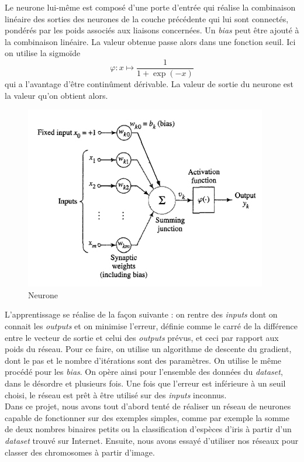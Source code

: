 \documentclass[a4paper,10pt]{article}
\begin{document}
Le neurone lui-même est composé d'une porte d'entrée qui réalise la combinaison linéaire des sorties des neurones de la couche
précédente qui lui sont connectés, pondérés par les poids associés aux liaisons concernées. Un \textit{bias} peut être ajouté
à la combinaison linéaire. La valeur obtenue
passe alors dans une fonction seuil. Ici on utilise la sigmoïde $$ \varphi : x \longmapsto \frac{1}{1+\exp(-x)}$$ qui a l'avantage
d'être continûment dérivable. La valeur de sortie du neurone est la valeur qu'on obtient alors.

\begin{figure}[H]
\centering
\includegraphics[scale = 0.6]{neuron}
\caption{Neurone}
 
\end{figure}

L'apprentissage se réalise de la façon suivante : on rentre des \textit{inputs} dont on connait les \textit{outputs} et on minimise
l'erreur, définie comme le carré de la différence entre le vecteur de sortie et celui des \textit{outputs} prévus, et ceci par rapport
aux poids du réseau. Pour ce faire, on utilise un algorithme de descente du gradient, dont le pas et le nombre d'itérations 
sont des paramètres. On utilise le même procédé pour les \textit{bias}. On opère ainsi pour l'ensemble des données du \textit{dataset}, 
dans le désordre et plusieurs fois. Une fois que l'erreur est inférieure à un seuil choisi, le réseau est prêt à être utilisé 
sur des \textit{inputs} inconnus.
\\
Dans ce projet, nous avons tout d'abord tenté de réaliser un réseau de neurones capable de fonctionner sur des exemples simples, comme 
par exemple la somme de deux nombres binaires petits ou la classification d'espèces d'iris à partir d'un \textit{dataset} trouvé
sur Internet. Ensuite, nous avons essayé d'utiliser nos réseaux pour classer des chromosomes à partir d'image.
\end{document}
